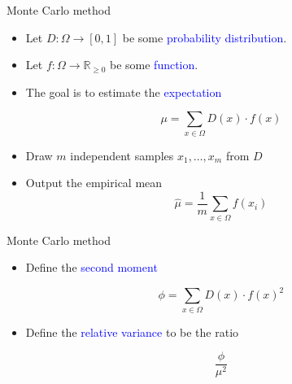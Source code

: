 \documentclass{beamer}
\newcommand{\R}{\mathbb{R}}
\renewcommand{\>}{\rangle}
\newcommand{\<}{\langle}
\begin{document}
\begin{frame}{Monte Carlo method}
    \begin{itemize}
        \item Let $D : \Omega \rightarrow [0,1]$ be some \textcolor{blue}{probability distribution}.
    
        \medskip
        \item Let $f : \Omega \rightarrow \R_{\ge 0}$ be some \textcolor{blue}{function}.
        
        \medskip
        \item The goal is to estimate the \textcolor{blue}{expectation}
        
        \begin{equation*}
            \mu = \sum_{x\in\Omega} D(x) \cdot f(x)
        \end{equation*}

        \bigskip
        \item Draw $m$ independent samples $x_1,\ldots,x_m$ from $D$
            
        \medskip
        \item Output the empirical mean
        \begin{equation*}
            \hat{\mu} = \frac{1}{m} \sum_{x\in\Omega} f(x_i)
        \end{equation*}
    \end{itemize}
\end{frame}

%

\begin{frame}{Monte Carlo method}
    \begin{itemize}
        \item Define the \textcolor{blue}{second moment}
        
        \begin{equation*}
            \phi = \sum_{x\in\Omega} D(x) \cdot f(x)^2
        \end{equation*}
        
        \medskip
        \item 
        Define the \textcolor{blue}{relative variance} to be the ratio 
        
        \begin{equation*}
            \frac{\phi}{\mu^2}
        \end{equation*}
    \end{itemize}
\end{frame}

%
\end{document}
